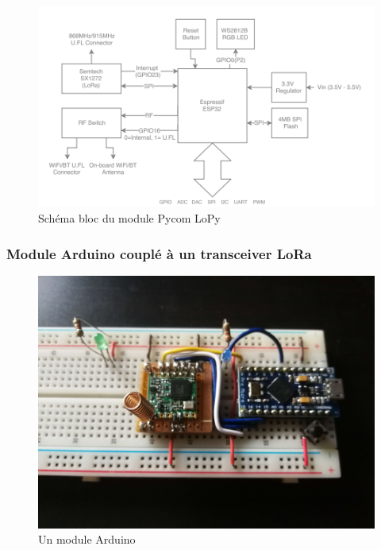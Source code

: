 \newpage

\begin{figure}[h]
\centering

\includegraphics[scale=1]{images/SBlopy.png}
\caption{Schéma bloc du module Pycom LoPy \protect\footnotemark[11]}\label{term3003}
\end{figure}


\subsubsection{Module Arduino couplé à un transceiver LoRa}\label{arduino}

\begin{figure}[h]
\centering

\includegraphics[scale=0.07]{images/arduino.png}
\caption{Un module Arduino}\label{term36}
\end{figure}


